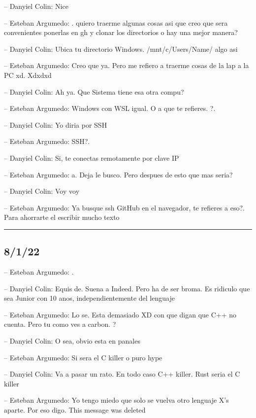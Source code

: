 -- Danyiel Colin: Nice

-- Esteban Argumedo: . quiero traerme algunas cosas asi que creo que
sera convenientes ponerlas en gh y clonar los directorios o hay una
mejor manera?

-- Danyiel Colin: Ubica tu directorio Windows. /mnt/c/Users/Name/ algo
asi

-- Esteban Argumedo: Creo que ya. Pero me refiero a traerme cosas de la
lap a la PC xd. Xdxdxd

-- Danyiel Colin: Ah ya. Que Sistema tiene esa otra compu?

-- Esteban Argumedo: Windows con WSL igual. O a que te refieres. ?.

-- Danyiel Colin: Yo diria por SSH

-- Esteban Argumedo: SSH?.

-- Danyiel Colin: Si, te conectas remotamente por clave IP

-- Esteban Argumedo: a. Deja le busco. Pero despues de esto que mas
seria?

-- Danyiel Colin: Voy voy

-- Esteban Argumedo: Ya busque ssh GitHub en el navegador, te refieres a
eso?. Para ahorrarte el escribir mucho texto

\begin{center}\rule{0.5\linewidth}{0.5pt}\end{center}

\hypertarget{section-137}{%
\subsection{8/1/22}\label{section-137}}

-- Esteban Argumedo: .

-- Danyiel Colin: Equis de. Suena a Indeed. Pero ha de ser broma. Es
ridiculo que sea Junior con 10 anos, independientemente del lenguaje

-- Esteban Argumedo: Lo se. Esta demasiado XD con que digan que C++ no
cuenta. Pero tu como ves a carbon. ?

-- Danyiel Colin: O sea, obvio esta en panales

-- Esteban Argumedo: Si sera el C killer o puro hype

-- Danyiel Colin: Va a pasar un rato. En todo caso C++ killer. Rust
seria el C killer

-- Esteban Argumedo: Yo tengo miedo que solo se vuelva otro lenguaje X's
aparte. Por eso digo. This message was deleted

